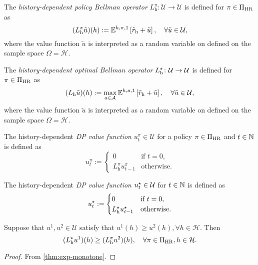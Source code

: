 \begin{definition} \label{def:DPhpi}
The \emph{history-dependent policy Bellman operator} $L_{\mathrm{h}}^{\pi} \colon \mathcal{U} \to \mathcal{U}$ is defined for $\pi\in \Pi_{\mathrm{HR}}$ as
  \[
    (L_{\mathrm{h}}^{\pi} \tilde{u}) (h)
    :=
    \mathbb{E}^{h, \pi, 1} \left[ \tilde{r}_{\mathrm{h}} + \tilde{u} \right], \quad \forall \tilde{u} \in \mathcal{U},
  \]
  where the value function $\tilde{u}$ is interpreted as a random variable on defined on the sample space $\Omega = \mathcal{H}$.
   \leanok
\end{definition}

\begin{definition}\label{def:DPhopt} 
The \emph{history-dependent optimal Bellman operator} $L_{\mathrm{h}}^{\star} \colon \mathcal{U} \to \mathcal{U}$ is defined for $\pi\in \Pi_{\mathrm{HR}}$ as
  \[
    (L_{\mathrm{h}} \tilde{u}) (h)
    :=
    \max_{a\in \mathcal{A}} \mathbb{E}^{h, a, 1} \left[ \tilde{r}_{\mathrm{h}} + \tilde{u} \right], \quad \forall \tilde{u} \in \mathcal{U},
  \]
  where the value function $\tilde{u}$ is interpreted as a random variable on defined on the sample space $\Omega = \mathcal{H}$.
  \leanok
\end{definition}

\begin{definition} \label{def:u-dp-pi}
  The history-dependent \emph{DP value function} $u_t^{\pi} \in \mathcal{U}$ for a policy $\pi\in \Pi_{\mathrm{HR}}$ and $t\in \mathbb{N}$ is defined as
  \[
   u_t^{\pi} :=
   \begin{cases}
     0 &\text{if } t = 0, \\
     L_{\mathrm{h}}^{\pi} u_{t-1}^{\pi} &\text{otherwise}.
   \end{cases}
 \]
 \leanok
\end{definition}

\begin{definition} \label{def:u-dp-opt}
  The history-dependent \emph{DP value function} $u_t^{\star} \in \mathcal{U}$ for $t\in \mathbb{N}$ is defined as
  \[
   u_t^{\star}  :=
   \begin{cases}
     0 &\text{if } t = 0, \\
     L_{\mathrm{h}}^{\star} u_{t-1}^{\star} &\text{otherwise}.
   \end{cases}
 \]
 \leanok
\end{definition}

\begin{lemma}\label{thm:dp-opt-ge-dp-pi}
  Suppose that $u^1, u^2 \in \mathcal{U}$ satisfy that $u^1(h) \ge u^2(h), \forall h\in \mathcal{H}$. Then
  \[
   (L_{\mathrm{h}}^{\star} u^1)(h) \ge  
   (L_{\mathrm{h}}^{\pi} u^2)(h), \quad \forall \pi\in \Pi_{\mathrm{HR}}, h\in \mathcal{H}.
  \]
\end{lemma}
\begin{proof}
  From \cref{thm:exp-monotone}.
\end{proof}

